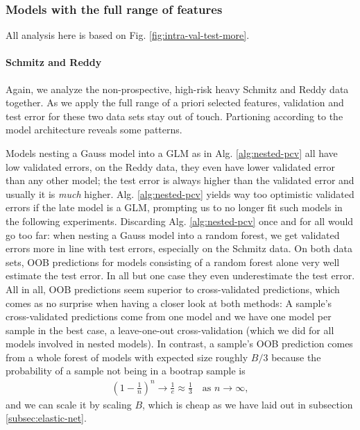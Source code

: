 \subsubsection{Models with the full range of features}



All analysis here is based on Fig. \ref{fig:intra-val-test-more}.

\paragraph{Schmitz and Reddy}
Again, we analyze the non-prospective, high-risk heavy Schmitz and Reddy data together. As we apply
the full range of a priori selected features, validation and test error for these two data sets 
stay out of touch. Partioning according to the model architecture reveals some patterns. 

Models 
nesting a Gauss model into a GLM as in Alg. \ref{alg:nested-pcv} all have low validated errors, on 
the Reddy data, they even have lower validated error than any other model; the test error is 
always higher than the validated error and usually it is \textit{much} higher. Alg. \ref{alg:nested-pcv} 
yields way too optimistic validated errors if the late model is a GLM, prompting us to no longer 
fit such models in the following experiments. Discarding Alg. \ref{alg:nested-pcv} once and for all
would go too far: when nesting a Gauss model into a random forest, we get validated errors more in 
line with test errors, especially on the Schmitz data. On both data sets, OOB predictions for 
models consisting of a random forest alone very well estimate the test error. In all but one case 
they even underestimate the test error. All in all, OOB predictions seem superior to 
cross-validated predictions, which comes as no surprise when having a closer look at both 
methods: A sample's cross-validated predictions come from one model and we have one model per 
sample in the best case, a leave-one-out cross-validation (which we did for all models involved in 
nested models). In contrast, a sample's OOB prediction comes from a whole forest of models with 
expected size roughly $B/3$ because the probability of a sample not being in a bootrap sample 
is
\begin{align}
    \left( 1 - \frac{1}{n} \right)^n \to \frac{1}{e} \approx \frac{1}{3} \quad \text{as } n \to 
    \infty,
\end{align}
and we can scale it by scaling $B$, which is cheap as we have laid out in subsection 
\ref{subsec:elastic-net}.

